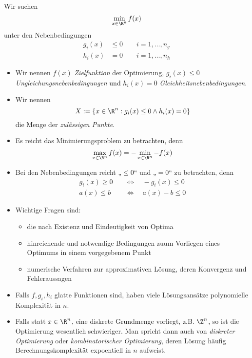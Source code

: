 \documentclass[11pt]{scrartcl}
\begin{document}
Wir suchen
\[
	\min_{x \in \R^n} f(x)
\]
unter den Nebenbedingungen
\begin{align*}
	g_i(x) &\le 0 \qquad i=1,\dotsc, n_g \\
	h_i(x) &= 0 \qquad i = 1,\dotsc, n_h
\end{align*}
\begin{itemize}
	\item
		Wir nennen $f(x)$ \emph{Zielfunktion} der Optimierung, $g_i(x) \le 0$ \emph{Ungleichungsnebenbedingungen} und $h_i(x)=0$ \emph{Gleichheitsnebenbedingungen}.
	\item
		Wir nennen
		\[
			X := \{x\in \R^n : g_i(x) \le 0 \land h_i(x) = 0 \}
		\]
		die Menge der \emph{zulässigen Punkte}.
	\item
		Es reicht das Minimierungsproblem zu betrachten, denn
		\[
			\max_{x\in \R^n} f(x) = -\min_{x\in\R^n} -f(x)
		\]
	\item
		Bei den Nebenbedingungen reicht „$\le 0$“ und „$= 0$“ zu betrachten, denn
		\begin{align*}
			g_i(x) \ge 0 \quad &\iff \quad -g_i(x) \le 0 \\
			a(x) \le b \quad &\iff \quad a(x) - b \le 0
		\end{align*}
	\item
		Wichtige Fragen sind:
		\begin{itemize}
			\item
				die nach Existenz und Eindeutigkeit von Optima 
			\item
				hinreichende und notwendige Bedingungen zuum Vorliegen eines Optimums in einem vorgegebenem Punkt
			\item
				numerische Verfahren zur approximativen Lösung, deren Konvergenz und Fehleraussagen
		\end{itemize}
	\item
		Falls $f,g_i,h_i$ glatte Funktionen sind, haben viele Lösungsansätze polynomielle Komplexität in $n$.
	\item
		Falls statt $x\in\R^n$, eine diskrete Grundmenge vorliegt, z.B. $\Z^n$, so ist die Optimierung wesentlich schwieriger.
		Man spricht dann auch von \emph{diskreter Optimierung} oder \emph{kombinatorischer Optimierung}, deren Lösung häufig Berechnungskomplexität expoentiell in $n$ aufweist.
\end{itemize}
\end{document}
